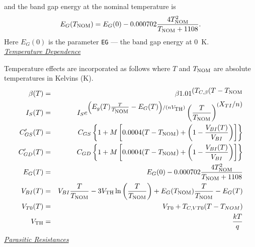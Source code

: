 \noindent and the band gap energy at the nominal temperature is
\begin{equation}
E_G(T_{\mbox{\scriptsize NOM}})=E_G(0)-0.000702{{4T_{\mbox{\scriptsize NOM}}^2}\over{T_{\mbox{\scriptsize NOM}}+1108}}.
\end{equation}
Here $E_G(0)$ is the parameter {\tt EG} --- the band gap energy at 0~K.\\[0.2in]
\noindent\underline{\sl \large Temperature Dependence}

Temperature effects are incorporated as follows where $T$ and $T_{\mbox{\scriptsize NOM}}$
are absolute temperatures in Kelvins (K).
\begin{eqnarray}
\beta(T) & = & \beta 1.01^{\textstyle(T_{C,\beta}(T-T_{\mbox{\scriptsize NOM}}}\\
I_S (T) & = & I_S e^{\left( \textstyle E_g(T) {T \over {T_{\mbox{\scriptsize NOM}}}}
 - E_G(T) \right) /(nV_{\mbox{\scriptsize TH}})}
    \left({{\textstyle T}\over{\textstyle T_{\mbox{\scriptsize NOM}}}}
    \right)^{(\textstyle X_{TI}/n)}\\
C'_{GS} (T)&=&C_{GS}\left\{1 + M \left[0.0004(T-T_{\mbox{\scriptsize NOM}})+\left(1-
   {{\textstyle V_{BI} (T)} \over {V_{BI}}}\right) \right]\right\} \\
C'_{GD} (T)&=&C_{GD}\left\{1 + M \left[0.0004(T-T_{\mbox{\scriptsize NOM}})+\left(1-
   {{\textstyle V_{BI} (T)} \over {V_{BI}}}\right) \right]\right\} \\
E_G(T) & = & E_G(0) - 0.000702{{4T_{\mbox{\scriptsize NOM}}^2} \over {T_{\mbox{\scriptsize NOM}}+1108}}\\
V_{BI} (T) & = & V_{BI} {T \over {T_{\mbox{\scriptsize NOM}}}}
 - 3V_{\mbox{\scriptsize TH}} \ln{\left( {{T} \over {T_{\mbox{\scriptsize NOM}}}}\right) }
              + E_G (T_{\mbox{\scriptsize NOM}}) {T \over {T_{\mbox{\scriptsize NOM}}}} -E_G(T)\\
V_{T0}(T)&=&V_{T0} + T_{C,VT0}(T- T_{NOM})\\
V_{\mbox{\scriptsize TH}} & = & {{kT} \over q}
\end{eqnarray}
\noindent\underline{\sl \large Parasitic Resistances}\\[0.1in]

